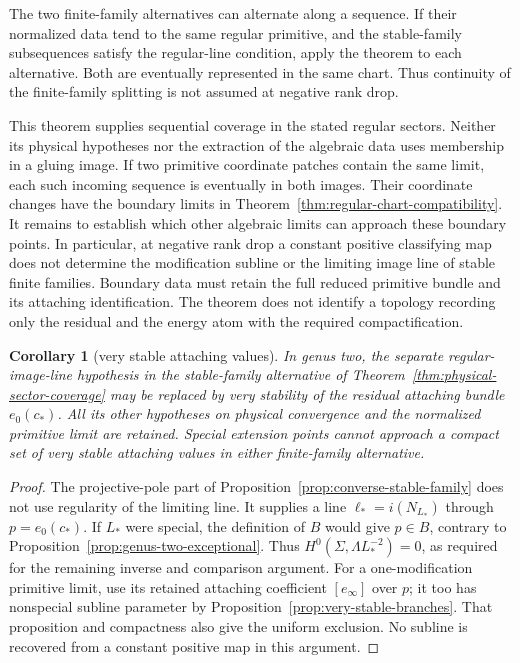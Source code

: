 \documentclass[11pt]{amsart}
\newtheorem{corollary}[theorem]{Corollary}
\theoremstyle{definition}
\theoremstyle{remark}
\theoremstyle{plain}
\begin{document}
The two finite-family alternatives can alternate along
a sequence. If their normalized data tend to the same
regular primitive, and the stable-family subsequences
satisfy the regular-line condition, apply the theorem
to each alternative. Both are eventually represented
in the same chart. Thus continuity of the finite-family
splitting is not assumed at negative rank drop.

This theorem supplies sequential coverage in the stated
regular sectors. Neither its physical hypotheses nor
the extraction of the algebraic data uses membership
in a gluing image. If two primitive coordinate patches
contain the same limit, each such incoming sequence is
eventually in both images. Their coordinate changes
have the boundary limits in
Theorem~\ref{thm:regular-chart-compatibility}.
It remains to establish which other algebraic limits
can approach these boundary points. In particular, at
negative rank drop a constant positive classifying
map does not determine the modification subline or the
limiting image line of stable finite families. Boundary
data must retain the full reduced primitive bundle and
its attaching identification. The theorem does not
identify a topology recording only the residual and
the energy atom with the required compactification.

\begin{corollary}[very stable attaching values]
\label{cor:very-stable-converse}
In genus two, the separate regular-image-line hypothesis in the
stable-family alternative of
Theorem~\ref{thm:physical-sector-coverage} may be replaced by very
stability of the residual attaching bundle $e_0(c_*)$.
All its other hypotheses on physical convergence and the
normalized primitive limit are retained. Special extension
points cannot approach a compact set of very stable attaching
values in either finite-family alternative.
\end{corollary}

\begin{proof}
The projective-pole part of
Proposition~\ref{prop:converse-stable-family} does not use
regularity of the limiting line. It supplies a line
$\ell_*=i(N_{L_*})$ through $p=e_0(c_*)$.
If $L_*$ were special, the definition of $B$ would give
$p\in B$, contrary to Proposition~\ref{prop:genus-two-exceptional}.
Thus $H^0(\Sigma,\Lambda L_*^{-2})=0$, as required for
the remaining inverse and comparison argument. For a
one-modification primitive limit, use its retained attaching
coefficient $[e_\infty]$ over $p$; it too has nonspecial
subline parameter by Proposition~\ref{prop:very-stable-branches}.
That proposition and compactness also give the uniform exclusion.
No subline is recovered from a constant positive map in this argument.
\end{proof}
\end{document}
